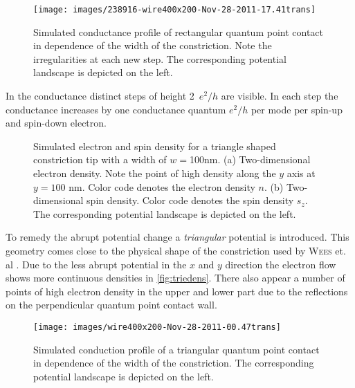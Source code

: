 \begin{figure}[h]
\centering
\texttt{[image: images/238916-wire400x200-Nov-28-2011-17.41trans]}
\caption{Simulated conductance profile of rectangular quantum point contact in dependence of the width of the constriction. Note the irregularities at each new step. The corresponding potential landscape is depicted on the left.}\label{fig:recttrans}
\end{figure}
In the conductance distinct steps of height 2~$e^2/h$ are visible. In each step the conductance increases by one conductance quantum $e^2/h$ per mode per spin-up and spin-down electron.\par
\begin{figure}[h]
\caption{Simulated electron and spin density for a triangle shaped constriction tip with a width of $w=$100nm. (a) Two-dimensional electron density. Note the point of high density along the $y$ axis at $y=100$ nm. Color code denotes the electron density $n$. (b) Two-dimensional spin density.  Color code denotes the spin density $s_z$. The corresponding potential landscape is depicted on the left.}
\end{figure}
To remedy the abrupt potential change a \emph{triangular} potential is introduced. This geometry comes close to the physical shape of the constriction used by \textsc{Wees} et. al \cite{PhysRevLett.60.848}. Due to the less abrupt potential in the $x$ and $y$ direction the electron flow shows more continuous densities in \cref{fig:triedens}. There also appear a number of points of high electron density in the upper and lower part due to the reflections on the perpendicular quantum point contact wall.\par
\begin{figure}[h]
\centering
\texttt{[image: images/wire400x200-Nov-28-2011-00.47trans]}
\caption{Simulated conduction profile of a triangular quantum point contact in dependence of the width of the constriction. The corresponding potential landscape is depicted on the left.}\label{fig:tritrans}
\end{figure}
